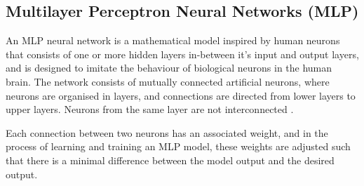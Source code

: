 \subsection{Multilayer Perceptron Neural Networks (MLP)}
An MLP neural network is a mathematical model inspired by human neurons that consists of one or more hidden layers in-between it's input and output layers, and is designed to imitate the behaviour of biological neurons in the human brain. The network consists of mutually connected artificial neurons, where neurons are organised in layers, and connections are directed from lower layers to upper layers. Neurons from the same layer are not interconnected \cite{noriega2005multilayer}.

Each connection between two neurons has an associated weight, and in the process of learning and training an MLP model, these weights are adjusted such that there is a minimal difference between the model output and the desired output. 
